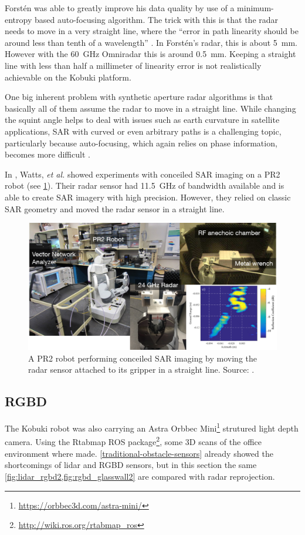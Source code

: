 Forstén was able to greatly improve his data quality by use of a minimum-entropy based auto-focusing algorithm. The trick with this is that the radar needs to move in a very straight line, where the ``error in path linearity should be around less than tenth of a wavelength'' \cite{Forsten2015}. In Forstén's radar, this is about \SI{5}{mm}. However with the \SI{60}{GHz} Omniradar this is around \SI{0.5}{mm}. Keeping a straight line with less than half a millimeter of linearity error is not realistically achievable on the Kobuki platform.

One big inherent problem with synthetic aperture radar algorithms is
that basically all of them assume the radar to move in a straight line.
While changing the squint angle helps to deal with issues such as earth
curvature in satellite applications, SAR with curved or even arbitrary
paths is a challenging topic, particularly because auto-focusing, which
again relies on phase information, becomes more difficult
\cite{Axelsson2002}.

In \cite{Watts2016}, Watts, \textit{et al.} showed experiments with conceiled SAR imaging on a PR2 robot (see \cref{fig:pr2}). Their radar sensor had \SI{11.5}{GHz} of bandwidth available and is able to create SAR imagery with high precision. However, they relied on classic SAR geometry and moved the radar sensor in a straight line.

\begin{figure}[htbp]
    \centering
    \includegraphics[max width=\textwidth]{gfx/pictures/pr2_sar.png}
    \caption{A PR2 robot performing conceiled SAR imaging by moving the radar sensor attached to its gripper in a straight line. Source: \cite{Watts2016}.}
    \label{fig:pr2}
\end{figure}


\subsection{RGBD}\label{rgbd-1}
The Kobuki robot was also carrying an Astra Orbbec Mini\footnote{\url{https://orbbec3d.com/astra-mini/}} strutured light depth camera. Using the Rtabmap \cite{Labbe2014} ROS package\footnote{\url{http://wiki.ros.org/rtabmap_ros}}, some 3D scans of the office environment where made. \cref{traditional-obstacle-sensors} already showed the shortcomings of lidar and RGBD sensors, but in this section the same \cref{fig:lidar_rgbd2,fig:rgbd_glasswall2} are compared with radar reprojection.

